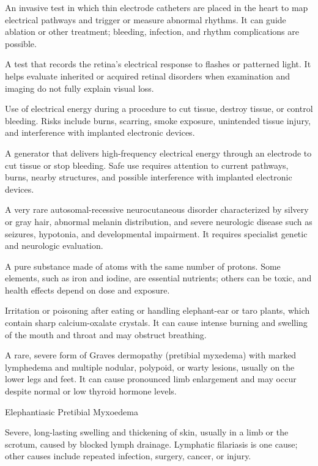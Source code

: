  An invasive test in which thin electrode catheters are placed in the heart to map electrical pathways and trigger or measure abnormal rhythms. It can guide ablation or other treatment; bleeding, infection, and rhythm complications are possible.

 A test that records the retina’s electrical response to flashes or patterned light. It helps evaluate inherited or acquired retinal disorders when examination and imaging do not fully explain visual loss.

 Use of electrical energy during a procedure to cut tissue, destroy tissue, or control bleeding. Risks include burns, scarring, smoke exposure, unintended tissue injury, and interference with implanted electronic devices.

 A generator that delivers high-frequency electrical energy through an electrode to cut tissue or stop bleeding. Safe use requires attention to current pathways, burns, nearby structures, and possible interference with implanted electronic devices.

 A very rare autosomal-recessive neurocutaneous disorder characterized by silvery or gray hair, abnormal melanin distribution, and severe neurologic disease such as seizures, hypotonia, and developmental impairment. It requires specialist genetic and neurologic evaluation.

 A pure substance made of atoms with the same number of protons. Some elements, such as iron and iodine, are essential nutrients; others can be toxic, and health effects depend on dose and exposure.

 Irritation or poisoning after eating or handling elephant-ear or taro plants, which contain sharp calcium-oxalate crystals. It can cause intense burning and swelling of the mouth and throat and may obstruct breathing.

 A rare, severe form of Graves dermopathy (pretibial myxedema) with marked lymphedema and multiple nodular, polypoid, or warty lesions, usually on the lower legs and feet. It can cause pronounced limb enlargement and may occur despite normal or low thyroid hormone levels.

\synonyms
Elephantiasic Pretibial Myxoedema

 Severe, long-lasting swelling and thickening of skin, usually in a limb or the scrotum, caused by blocked lymph drainage. Lymphatic filariasis is one cause; other causes include repeated infection, surgery, cancer, or injury.

